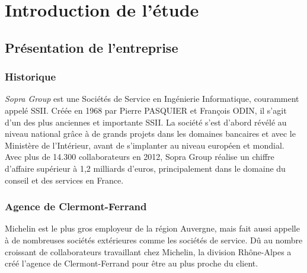 \cleardoublepage

\chapter{Introduction de l'étude}


\section{Présentation de l'entreprise}


\subsection{Historique}

\textit{Sopra Group} est une Sociétés de Service en Ingénierie Informatique, couramment appelé SSII.
Créée en 1968 par Pierre PASQUIER et François ODIN, il s'agit d'un des plus anciennes et importante SSII.
La société s'est d'abord révélé au niveau national grâce à de grands projets dans les domaines bancaires et avec le Ministère de l'Intérieur, avant de s'implanter au niveau européen et mondial.
Avec plus de 14.300 collaborateurs en 2012, Sopra Group réalise un chiffre d'affaire supérieur à 1,2 milliards d'euros, principalement dans le domaine du conseil et des services en France.

\subsection{Agence de Clermont-Ferrand}

Michelin est le plus gros employeur de la région Auvergne, mais fait aussi appelle à de nombreuses sociétés extérieures comme les sociétés de service.
Dû au nombre croissant de collaborateurs travaillant chez Michelin, la division Rhône-Alpes a créé l'agence de Clermont-Ferrand pour être au plus proche du client.

